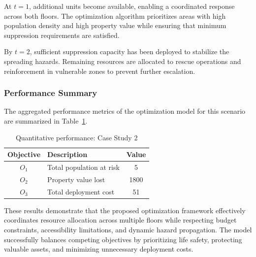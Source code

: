 At $t=1$, additional units become available, enabling a coordinated response across both floors. The optimization algorithm prioritizes areas with high population density and high property value while ensuring that minimum suppression requirements are satisfied.

By $t=2$, sufficient suppression capacity has been deployed to stabilize the spreading hazards. Remaining resources are allocated to rescue operations and reinforcement in vulnerable zones to prevent further escalation.

\subsubsection{Performance Summary}

The aggregated performance metrics of the optimization model for this scenario are summarized in Table~\ref{tab:case2_performance}.

\begin{table}[!htb]
\caption{Quantitative performance: Case Study 2}
\label{tab:case2_performance}
\centering
\begin{tabular}{|c|l|c|}
\hline
\textbf{Objective} & \textbf{Description} & \textbf{Value} \\ \hline
$O_1$ & Total population at risk & 5 \\ \hline
$O_2$ & Property value lost & 1800 \\ \hline
$O_3$ & Total deployment cost & 51 \\ \hline
\end{tabular}
\end{table}

These results demonstrate that the proposed optimization framework effectively coordinates resource allocation across multiple floors while respecting budget constraints, accessibility limitations, and dynamic hazard propagation. The model successfully balances competing objectives by prioritizing life safety, protecting valuable assets, and minimizing unnecessary deployment costs.